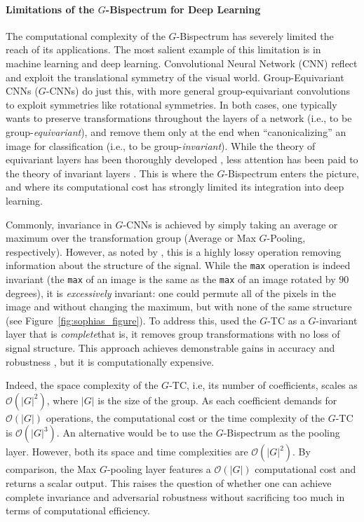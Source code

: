 \documentclass{article}
\theoremstyle{plain}
\theoremstyle{definition}
\theoremstyle{remark}
\begin{document}
\paragraph{Limitations of the $G$-Bispectrum for Deep Learning} The computational complexity of the $G$-Bispectrum has severely limited the reach of its applications. The most salient example of this limitation is in machine learning and deep learning. Convolutional Neural Network (CNN) \citep{lecun95convolutional,LeNet5} reflect and exploit the translational symmetry of the visual world. Group-Equivariant CNNs ($G$-CNNs) \citep{cohenc16, pmlr-v80-kondor18a} do just this, with more general group-equivariant convolutions to exploit %
symmetries like rotational symmetries. In both cases, one typically wants to preserve transformations throughout the layers of a network (i.e., to be group-\textit{equivariant}), and remove them only at the end when ``canonicalizing'' an image for classification (i.e., to be group-\textit{invariant}). While the theory of equivariant layers has been thoroughly developed \citep{cohen2021equivariant, weiler2023EquivariantAndCoordinateIndependentCNNs}, less attention has been paid to the theory of invariant layers \citep{higgins2018definition}. This is where the $G$-Bispectrum enters the picture, and where its computational cost has strongly limited its integration into deep learning.

Commonly, invariance in $G$-CNNs is achieved by simply taking an average or maximum over the transformation group (Average or Max $G$-Pooling, respectively). However, as noted by \citet{sanborn2023general}, this is a highly lossy operation removing information about the structure of the signal. While the \texttt{max} operation is indeed invariant (the \texttt{max} of an image is the same as the \texttt{max} of an image rotated by $90$ degrees), it is \textit{excessively} invariant: one could permute all of the pixels in the image and without changing the maximum, but with none of the same structure (see Figure~\ref{fig:sophias_figure}). To address this, \citet{sanborn2023general} used the $G$-TC as a $G$-invariant layer that is \textit{complete}\textemdash that is, it removes group transformations with no loss of signal structure. This approach achieves demonstrable gains in accuracy and robustness \citep{sanborn2023general}, but it is computationally expensive.

Indeed, the space complexity of the $G$-TC, i.e, its number of coefficients, scales as $\mathcal{O}(|G|^2)$, where $|G|$ is the size of the group. As each coefficient demands for $\mathcal{O}(|G|)$ operations, the computational cost or the time complexity of the $G$-TC is $\mathcal{O}(|G|^3)$. An alternative would be to use the $G$-Bispectrum as the pooling layer. However, both its space and time complexities are $\mathcal{O}(|G|^2)$. By comparison, the Max $G$-pooling layer features a $\mathcal{O}(|G|)$ computational cost and returns a scalar output. This raises the question of whether one can achieve complete invariance and adversarial robustness without sacrificing too much in terms of computational efficiency.
\end{document}
